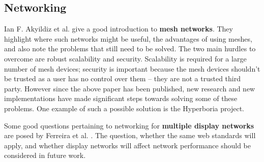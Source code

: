 \subsection{Networking}

Ian F. Akyildiz et al. \cite{akyildiz2005survey} give a good introduction to \textbf{mesh networks}.
They highlight where such networks might be useful, the advantages of using meshes, and also note the problems that still need to be solved.
The two main hurdles to overcome are robust scalability and security.
Scalability is required for a large number of mesh devices; security is important because the mesh devices shouldn't be trusted as a user has no control over them – they are not a trusted third party.
However since the above paper has been published, new research and new implementations have made significant steps towards solving some of these problems.
One example of such a possible solution is the Hyperboria \cite{hyperboria} project.

Some good questions pertaining to networking for \textbf{multiple display networks} are posed by Ferreira et al. \cite{ferreira2012scalability}.
The question, whether the same web standards will apply, and whether display networks will affect network performance should be considered in future work.
